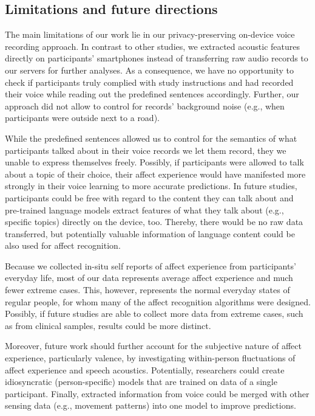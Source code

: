 \documentclass[
  english,
  man,floatsintext]{apa6}
\begin{document}
\hypertarget{limitations-and-future-directions}{%
\subsection{Limitations and future directions}\label{limitations-and-future-directions}}

The main limitations of our work lie in our privacy-preserving on-device voice recording approach. In contrast to other studies, we extracted acoustic features directly on participants' smartphones instead of transferring raw audio records to our servers for further analyses. As a consequence, we have no opportunity to check if participants truly complied with study instructions and had recorded their voice while reading out the predefined sentences accordingly. Further, our approach did not allow to control for records' background noise (e.g., when participants were outside next to a road).

While the predefined sentences allowed us to control for the semantics of what participants talked about in their voice records we let them record, they we unable to express themselves freely. Possibly, if participants were allowed to talk about a topic of their choice, their affect experience would have manifested more strongly in their voice learning to more accurate predictions. In future studies, participants could be free with regard to the content they can talk about and pre-trained language models extract features of what they talk about (e.g., specific topics) directly on the device, too. Thereby, there would be no raw data transferred, but potentially valuable information of language content could be also used for affect recognition.

Because we collected in-situ self reports of affect experience from participants' everyday life, most of our data represents average affect experience and much fewer extreme cases. This, however, represents the normal everyday states of regular people, for whom many of the affect recognition algorithms were designed. Possibly, if future studies are able to collect more data from extreme cases, such as from clinical samples, results could be more distinct.

Moreover, future work should further account for the subjective nature of affect experience, particularly valence, by investigating within-person fluctuations of affect experience and speech acoustics. Potentially, researchers could create idiosyncratic (person-specific) models that are trained on data of a single participant. Finally, extracted information from voice could be merged with other sensing data (e.g., movement patterns) into one model to improve predictions.
\end{document}
